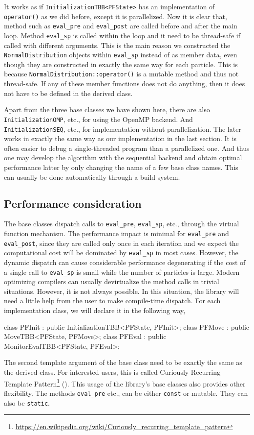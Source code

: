 It works as if \verb|InitializationTBB<PFState>| has an implementation of
\verb|operator()| as we did before, except it is parallelized. Now it is clear
that, method such as \verb|eval_pre| and \verb|eval_post| are called before and
after the main loop. Method \verb|eval_sp| is called within the loop and it
need to be thread-safe if called with different arguments. This is the main
reason we constructed the \verb|NormalDistribution| objects within
\verb|eval_sp| instead of as member data, even though they are constructed in
exactly the same way for each particle. This is because
\verb|NormalDistribution::operator()| is a mutable method and thus not
thread-safe. If any of these member functions does not do anything, then it
does not have to be defined in the derived class.

Apart from the three base classes we have shown here, there are also
\verb|InitializationOMP|, etc., for using the OpenMP backend. And
\verb|InitializationSEQ|, etc., for implementation without parallelization. The
later works in exactly the same way as our implementation in the last section.
It is often easier to debug a single-threaded program than a parallelized one.
And thus one may develop the algorithm with the sequential backend and obtain
optimal performance latter by only changing the name of a few base class names.
This can usually be done automatically through a build system.

\subsection{Performance consideration}
\label{sec:Performance consideration}

The base classes dispatch calls to \verb|eval_pre|, \verb|eval_sp|, etc.,
through the virtual function mechanism. The performance impact is minimal for
\verb|eval_pre| and \verb|eval_post|, since they are called only once in each
iteration and we expect the computational cost will be dominated by
\verb|eval_sp| in most cases. However, the dynamic dispatch can cause
considerable performance degenerating if the cost of a single call to
\verb|eval_sp| is small while the number of particles is large. Modern
optimizing compilers can usually devirtualize the method calls in trivial
situations. However, it is not always possible. In this situation, the library
will need a little help from the user to make compile-time dispatch. For each
implementation class, we will declare it in the following way,
\begin{cppcode}
  class PFInit : public InitializationTBB<PFState, PFInit>;
  class PFMove : public MoveTBB<PFState, PFMove>;
  class PFEval : public MonitorEvalTBB<PFState, PFEval>;
\end{cppcode}
The second template argument of the base class need to be exactly the same as
the derived class. For interested users, this is called Curiously Recurring
Template
Pattern\footnote{\url{https://en.wikipedia.org/wiki/Curiously_recurring_template_pattern}}
(\crtp). This usage of the library's base classes also provides other
flexibility. The methods \verb|eval_pre| etc., can be either \verb|const| or
mutable. They can also be \verb|static|.
